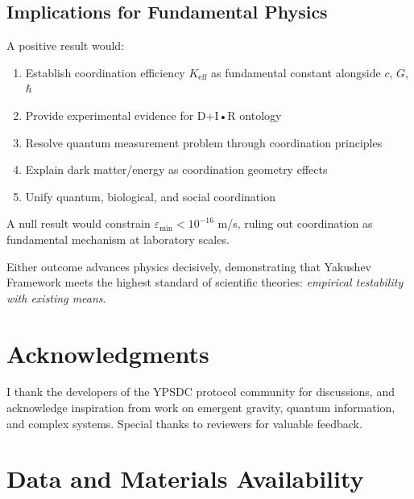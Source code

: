 \documentclass[11pt,a4paper]{article}
\begin{document}
	\subsection{Implications for Fundamental Physics}
	
	A positive result would:
	\begin{enumerate}
		\item Establish coordination efficiency $K_{\mathrm{eff}}$ as fundamental constant alongside $c$, $G$, $\hbar$
		\item Provide experimental evidence for D+I•R ontology
		\item Resolve quantum measurement problem through coordination principles
		\item Explain dark matter/energy as coordination geometry effects
		\item Unify quantum, biological, and social coordination
	\end{enumerate}
	
	A null result would constrain $\varepsilon_{\min} < 10^{-16}$ m/s, ruling out coordination as fundamental mechanism at laboratory scales.
	
	Either outcome advances physics decisively, demonstrating that Yakushev Framework meets the highest standard of scientific theories: \emph{empirical testability with existing means}.
		
	\section*{Acknowledgments}
	I thank the developers of the YPSDC protocol community for discussions, and acknowledge inspiration from work on emergent gravity, quantum information, and complex systems. Special thanks to reviewers for valuable feedback.
	\section*{Data and Materials Availability}
	
\end{document}
